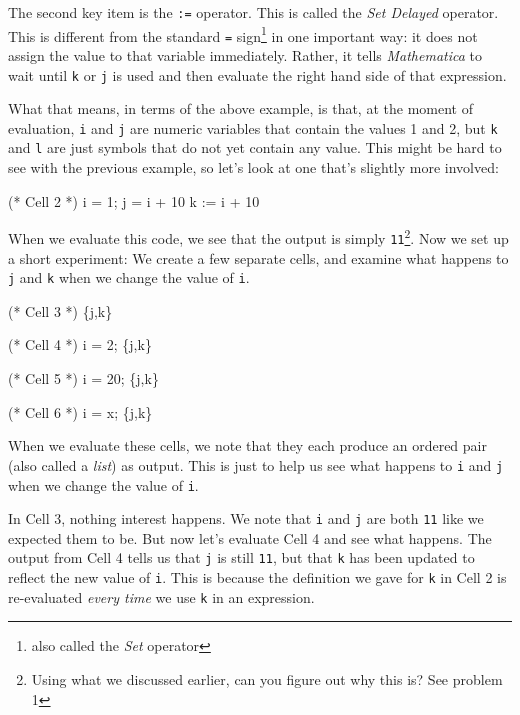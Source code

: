 The second key item is the \texttt{:=} operator. This is called the \emph{Set Delayed} operator. This is different from the standard \texttt{=} sign\footnote{also called the \emph{Set} operator} in one important way: it does not assign the value to that variable immediately. Rather, it tells \emph{Mathematica} to wait until \texttt{k} or \texttt{j} is used and then evaluate the right hand side of that expression. 

What that means, in terms of the above example, is that, at the moment of evaluation, \texttt{i} and \texttt{j} are numeric variables that contain the values 1 and 2, but \texttt{k} and \texttt{l} are just symbols that do not yet contain any value. This might be hard to see with the previous example, so let's look at one that's slightly more involved:

\begin{code}
	   (* Cell 2 *)
	   i = 1;
	   j = i + 10
	   k := i + 10
\end{code}

When we evaluate this code, we see that the output is simply \texttt{11}\footnote{Using what we discussed earlier, can you figure out why this is? See problem 1}. Now we set up a short experiment: We create a few separate cells, and examine what happens to \texttt{j} and \texttt{k} when we change the value of \texttt{i}.

\begin{code}
	   (* Cell 3 *)
	   \{j,k\}

	   (* Cell 4 *)
	   i = 2;
	   \{j,k\}

	   (* Cell 5 *)
	   i = 20;
	   \{j,k\}

	   (* Cell 6 *)
	   i = x;
	   \{j,k\}
\end{code}

When we evaluate these cells, we note that they each produce an ordered pair (also called a \emph{list}) as output. This is just to help us see what happens to \texttt{i} and \texttt{j} when we change the value of \texttt{i}.

In Cell 3, nothing interest happens. We note that \texttt{i} and \texttt{j} are both \texttt{11} like we expected them to be. But now let's evaluate Cell 4 and see what happens. The output from Cell 4 tells us that \texttt{j} is still \texttt{11}, but that \texttt{k} has been updated to reflect the new value of \texttt{i}. This is because the definition we gave for \texttt{k} in Cell 2 is re-evaluated \emph{every time} we use \texttt{k} in an expression.

